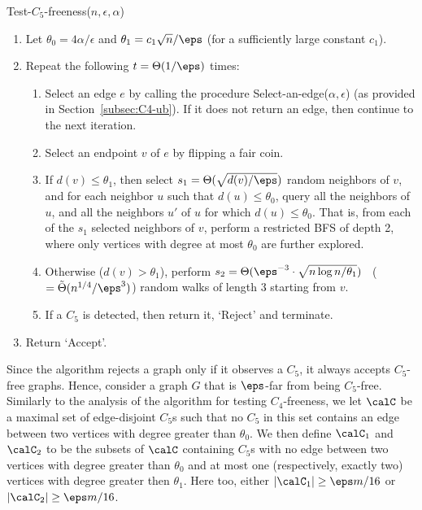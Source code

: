 \medskip\noindent
\textsf{Test-$C_5$-freeness}($n,\epsilon,\alpha$)\label{alg:C5}
\begin{enumerate}
\item Let $\theta_0 = 4\alpha/\epsilon$ and $\theta_1 =  c_1\sqrt{n}/\eps$ (for a sufficiently large constant $c_1$).
\label{step:set_params_C5}
\item Repeat the following %
$t = \Theta(1/\eps)$ times:
  \begin{enumerate}
     \item Select an edge $e$ by calling the procedure \textsf{Select-an-edge}($\alpha,\epsilon$) (as provided in Section~\ref{subsec:C4-ub}).  If it
     does not return an edge, then continue to the next iteration.
     \item Select an endpoint $v$ of $e$ by flipping a fair coin.
     \item \label{step:random-neighbors-C5} If $d(v) \leq \theta_1$, then select %
     $s_1= \Theta(\sqrt{d(v)/\eps})$ 
     random neighbors of $v$, and for each neighbor $u$ such that $d(u) \leq \theta_0$, query all the neighbors of $u$, and all the neighbors $u'$ of $u$ for which $d(u) \leq \theta_0$.
     That is, from each of the $s_1$ selected neighbors of $v$, perform a restricted BFS of depth 2, where only vertices with degree at most $\theta_0$ are further explored.
     \item \label{step:random-walk-C5} Otherwise ($d(v) > \theta_1$), perform 
     $s_2 = \Theta(\eps^{-3}\cdot\sqrt{n\log n/\theta_1})$ ~($=\tilde{\Theta}(n^{1/4}/\eps^3)$)
     random walks of length $3$ starting from $v$. %
     \item If a $C_5$ is detected, then return it, `Reject' and terminate.
  \end{enumerate}
  \item Return `Accept'.
\end{enumerate}
Since the algorithm rejects a graph only if it observes a $C_5$, it always accepts $C_5$-free graphs. Hence, consider a graph $G$  that is $\eps$-far from being $C_5$-free. 
Similarly to the analysis of the algorithm for testing $C_4$-freeness, we let $\calC$ be a maximal set of edge-disjoint $C_5$s such that no $C_5$ in this set contains an edge between two vertices with degree greater than $\theta_0$. We then define $\calC_1$ and $\calC_2$ to be the subsets of $\calC$ containing $C_5$s with no edge between two vertices with degree greater than $\theta_0$ and at most one (respectively, exactly two) vertices with degree greater then $\theta_1$. Here too, either $|\calC_1|\geq \eps m/16$ or $|\calC_2|\geq \eps m/16$.

